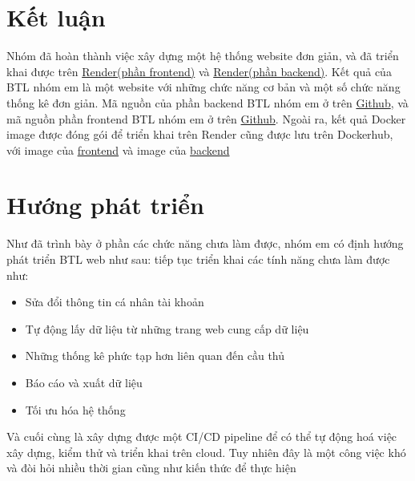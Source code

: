 \documentclass[../BTL.tex]{subfiles}
\begin{document}
\section{Kết luận}
Nhóm đã hoàn thành việc xây dựng một hệ thống website đơn giản, và đã triển khai được trên \href{https://epl-web-fe.onrender.com/}{Render(phần frontend)} và \href{https://epl-web.onrender.com/}{Render(phần backend)}. Kết quả của BTL nhóm em là một website với những chức năng cơ bản và một số chức năng thống kê đơn giản. Mã nguồn của phần backend BTL nhóm em ở trên \href{https://github.com/PTIT-Projects/football-stats-website-be}{Github}, và mã nguồn phần frontend BTL nhóm em ở trên \href{https://github.com/PTIT-Projects/football-stats-website-fe}{Github}. Ngoài ra, kết quả Docker image được đóng gói để triển khai trên Render cũng được lưu trên Dockerhub, với image của \href{https://hub.docker.com/repository/docker/vucongtuanduong/epl-web-fe/general}{frontend} và image của \href{https://hub.docker.com/repository/docker/vucongtuanduong/epl-web/general}{backend}
\section{ Hướng phát triển}
Như đã trình bày ở phần các chức năng chưa làm được, nhóm em có định hướng phát triển BTL web như sau: tiếp tục triển khai các tính năng chưa làm được như: 
\begin{itemize}
    \item Sửa đổi thông tin cá nhân tài khoản
    \item Tự động lấy dữ liệu từ những trang web cung cấp dữ liệu
    \item Những thống kê phức tạp hơn liên quan đến cầu thủ
    \item Báo cáo và xuất dữ liệu
    \item Tối ưu hóa hệ thống
\end{itemize}
Và cuối cùng là xây dựng được một CI/CD pipeline để có thể tự động hoá việc xây dựng, kiểm thử và triển khai trên cloud. Tuy nhiên đây là một công việc khó và đòi hỏi nhiều thời gian cũng như kiến thức để thực hiện
\end{document}
